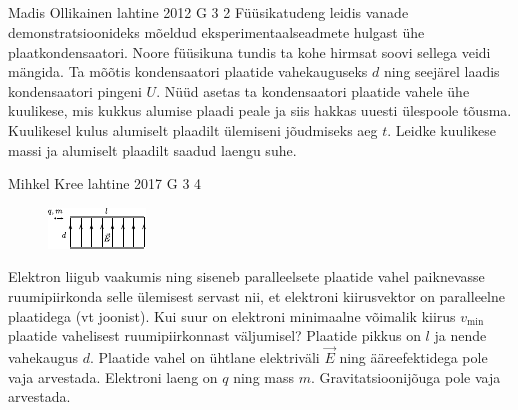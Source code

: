 \documentclass[11pt]{article}
\begin{document}
{{\begin{figure}[h]
\begin{center}
\end{center}
\end{figure}
\fi
}
\newpage\subsection{\protect{}}

{Madis Ollikainen} %
{lahtine} %
{2012} %
{G 3} %
{2} %
{
\ifStatement
Füüsikatudeng leidis vanade demonstratsioonideks mõeldud eksperimentaalseadmete
hulgast ühe plaatkondensaatori. Noore füüsikuna tundis ta kohe hirmsat soovi
sellega veidi mängida. Ta mõõtis kondensaatori plaatide vahekauguseks $d$
ning seejärel laadis kondensaatori pingeni $U$. Nüüd asetas ta
kondensaatori plaatide vahele ühe kuulikese, mis kukkus alumise plaadi peale
ja siis hakkas uuesti ülespoole tõusma. Kuulikesel kulus alumiselt plaadilt
ülemiseni jõudmiseks aeg $t$. Leidke kuulikese massi ja alumiselt plaadilt
saadud laengu suhe.
\fi
}

{Mihkel Kree} %
{lahtine} %
{2017} %
{G 3} %
{4} %
{
\ifStatement
\begin{figure}
	\vspace{-10pt}
	\hspace{-10pt}
	\includegraphics[width=\linewidth]{2017-lahg-03-elJoonisMK.pdf}
\end{figure}

Elektron liigub vaakumis ning siseneb paralleelsete plaatide vahel paiknevasse ruumipiirkonda selle ülemisest servast nii, et elektroni kiirusvektor on paralleelne plaatidega (vt joonist). Kui suur on elektroni minimaalne võimalik kiirus $v_\mathrm{min}$ plaatide vahelisest ruumipiirkonnast väljumisel? Plaatide pikkus on $l$ ja nende vahekaugus $d$. Plaatide vahel on ühtlane elektriväli $\vec{E}$ ning ääreefektidega pole vaja arvestada. Elektroni laeng on $q$ ning mass $m$. Gravitatsioonijõuga pole vaja arvestada.
\fi
}

}
\end{document}
